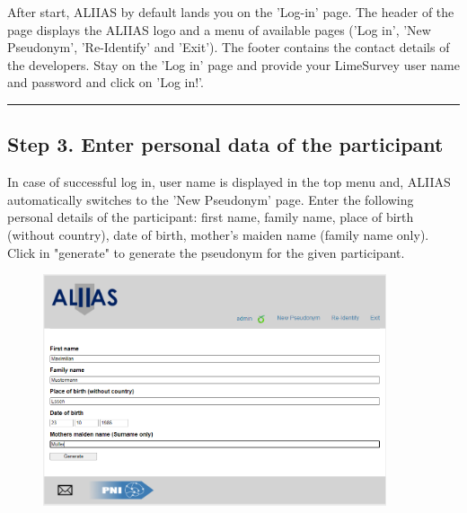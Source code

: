 After start, ALIIAS by default lands you on the 'Log-in' page.
The header of the page displays the ALIIAS logo and a menu of available pages ('Log in', 'New Pseudonym', 'Re-Identify' and 'Exit'). The footer contains the contact details of the developers.
Stay on the 'Log in' page and provide your LimeSurvey user name and password and click on 'Log in!'.

\small\setlength\fboxsep{5pt}\setlength\fboxrule{1pt}

\small\setlength\fboxsep{5pt}\setlength\fboxrule{1pt}

\par\noindent\rule{\textwidth\color{pniblue}}{0.4pt}
\subsection*{Step 3. Enter personal data of the participant}

In case of successful log in, user name is displayed in the top menu and, ALIIAS automatically switches to the 'New Pseudonym' page. Enter the following personal details of the participant: first name, family name, place of birth (without country), date of birth, mother's maiden name (family name only). Click in "generate" to generate the pseudonym for the given participant.

\begin{figure}[H]
\includegraphics[width=0.9\textwidth]{docs/fig/03_filled.PNG}
\end{figure}


